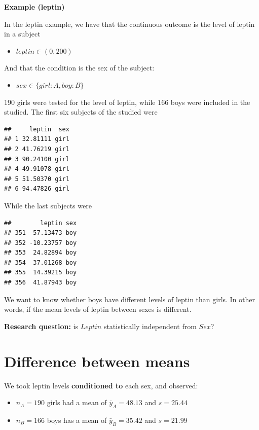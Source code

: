 \documentclass[
]{book}
\providecommand{\tightlist}{%
  \setlength{\itemsep}{0pt}\setlength{\parskip}{0pt}}
\begin{document}
\textbf{Example (leptin)}

In the leptin example, we have that the continuous outcome is the level of leptin in a subject

\begin{itemize}
\tightlist
\item
  \(leptin \in (0, 200)\)
\end{itemize}

And that the condition is the sex of the subject:

\begin{itemize}
\tightlist
\item
  \(sex \in \{girl:A,boy:B\}\)
\end{itemize}

\(190\) girls were tested for the level of leptin, while \(166\) boys were included in the studied. The first six subjects of the studied were

\begin{verbatim}
##     leptin  sex
## 1 32.81111 girl
## 2 41.76219 girl
## 3 90.24100 girl
## 4 49.91078 girl
## 5 51.50370 girl
## 6 94.47826 girl
\end{verbatim}

While the last subjects were

\begin{verbatim}
##        leptin sex
## 351  57.13473 boy
## 352 -10.23757 boy
## 353  24.82894 boy
## 354  37.01268 boy
## 355  14.39215 boy
## 356  41.87943 boy
\end{verbatim}

We want to know whether boys have different levels of leptin than girls. In other words, if the mean levels of leptin between sexes is different.

\textbf{Research question:} is \(Leptin\) statistically independent from \(Sex\)?

\hypertarget{difference-between-means}{%
\section{Difference between means}\label{difference-between-means}}

We took leptin levels \textbf{conditioned to} each sex, and observed:

\begin{itemize}
\item
  \(n_A=190\) girls had a mean of \(\bar{y}_A=48.13\) and \(s= 25.44\)
\item
  \(n_B=166\) boys has a mean of \(\bar{y}_B=35.42\) and \(s=21.99\)
\end{itemize}
\end{document}
